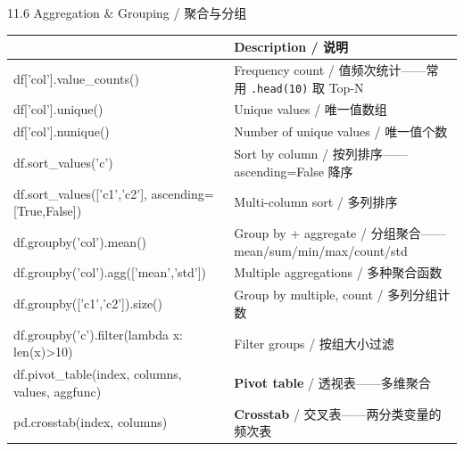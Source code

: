 \documentclass[11pt,a4paper]{report}
\let\oldtexttt\texttt
\renewcommand{\texttt}[1]{\textcolor{mainblue}{\oldtexttt{#1}}}
\begin{document}
\begin{cmdsection}{11.6  Aggregation \& Grouping / 聚合与分组}
\normalsize\renewcommand{\arraystretch}{1.4}
\centering
\begin{tabularx}{\textwidth}{@{}>{\ttfamily}l>{\raggedright\arraybackslash}X@{}}
\toprule
\multicolumn{1}{@{}l}{\textbf{Syntax}} & \textbf{Description / 说明} \\ \midrule
df['col'].value\_counts()    & Frequency count / 值频次统计——常用 \texttt{.head(10)} 取 Top-N \\
df['col'].unique()          & Unique values / 唯一值数组 \\
df['col'].nunique()         & Number of unique values / 唯一值个数 \\
df.sort\_values('c')         & Sort by column / 按列排序——ascending=False 降序 \\
df.sort\_values(['c1','c2'], ascending=[True,False]) & Multi-column sort / 多列排序 \\
df.groupby('col').mean()    & Group by + aggregate / 分组聚合——mean/sum/min/max/count/std \\
df.groupby('col').agg(['mean','std']) & Multiple aggregations / 多种聚合函数 \\
df.groupby(['c1','c2']).size() & Group by multiple, count / 多列分组计数 \\
df.groupby('c').filter(lambda x: len(x)>10) & Filter groups / 按组大小过滤 \\
df.pivot\_table(index, columns, values, aggfunc) & \textbf{Pivot table} / 透视表——多维聚合 \\
pd.crosstab(index, columns) & \textbf{Crosstab} / 交叉表——两分类变量的频次表 \\
\bottomrule
\end{tabularx}
\end{cmdsection}
\end{document}
